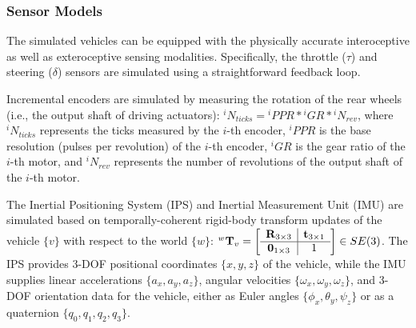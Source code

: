\subsubsection{Sensor Models}
\label{Sub-Section: Sensor Models}

The simulated vehicles can be equipped with the physically accurate interoceptive as well as exteroceptive sensing modalities. Specifically, the throttle ($\tau$) and steering ($\delta$) sensors are simulated using a straightforward feedback loop.

Incremental encoders are simulated by measuring the rotation of the rear wheels (i.e., the output shaft of driving actuators): $^iN_{ticks} = {^iPPR} * {^iGR} * {^iN_{rev}}$, where $^iN_{ticks}$ represents the ticks measured by the $i$-th encoder, $^iPPR$ is the base resolution (pulses per revolution) of the $i$-th encoder, $^iGR$ is the gear ratio of the $i$-th motor, and $^iN_{rev}$ represents the number of revolutions of the output shaft of the $i$-th motor.

The Inertial Positioning System (IPS) and Inertial Measurement Unit (IMU) are simulated based on temporally-coherent rigid-body transform updates of the vehicle $\{v\}$ with respect to the world $\{w\}$: ${^w\mathbf{T}_v} = \left[\begin{array}{c | c} \mathbf{R}_{3 \times 3} & \mathbf{t}_{3 \times 1} \\ \hline \mathbf{0}_{1 \times 3} & 1 \end{array}\right] \in SE(3)$. The IPS provides 3-DOF positional coordinates $\{x,y,z\}$ of the vehicle, while the IMU supplies linear accelerations $\{a_x,a_y,a_z\}$, angular velocities $\{\omega_x,\omega_y,\omega_z\}$, and 3-DOF orientation data for the vehicle, either as Euler angles $\{\phi_x,\theta_y,\psi_z\}$ or as a quaternion $\{q_0,q_1,q_2,q_3\}$.

